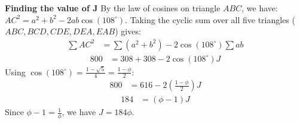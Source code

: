 \begin{enumerate}
 \textbf{Finding the value of J} By the law of cosines on triangle $ABC$, we have: $AC^2 = a^2 + b^2 - 2ab \cos(108^\circ)$. Taking the cyclic sum over all five triangles ($ABC, BCD, CDE, DEA, EAB$) gives:\begin{align*}\sum AC^2 &= \sum (a^2 + b^2) - 2\cos(108^\circ) \sum ab \end{align*}
 \begin{align*} 800 &= 308 + 308 - 2\cos(108^\circ)J \end{align*}
 Using $\cos(108^\circ) = \frac{1-\sqrt{5}}{4} = \frac{1-\phi}{2}$:\begin{align*}800 &= 616 - 2\left(\frac{1-\phi}{2}\right)J \end{align*}
 \begin{align*} 184 &= (\phi - 1)J\end{align*}
Since $\phi - 1 = \frac{1}{\phi}$, we have $J = 184\phi$.


\end{enumerate}
